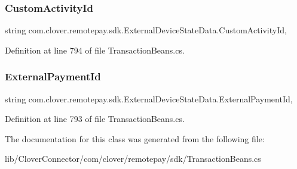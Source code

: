 \subsubsection{\texorpdfstring{Custom\+Activity\+Id}{CustomActivityId}}
{\footnotesize\ttfamily string com.\+clover.\+remotepay.\+sdk.\+External\+Device\+State\+Data.\+Custom\+Activity\+Id\hspace{0.3cm}{\ttfamily [get]}, {\ttfamily [set]}}



Definition at line 794 of file Transaction\+Beans.\+cs.

\mbox{\label{classcom_1_1clover_1_1remotepay_1_1sdk_1_1_external_device_state_data_ae34b82f2e85da36dec8fbe4fae2250be}} 
\subsubsection{\texorpdfstring{External\+Payment\+Id}{ExternalPaymentId}}
{\footnotesize\ttfamily string com.\+clover.\+remotepay.\+sdk.\+External\+Device\+State\+Data.\+External\+Payment\+Id\hspace{0.3cm}{\ttfamily [get]}, {\ttfamily [set]}}



Definition at line 793 of file Transaction\+Beans.\+cs.



The documentation for this class was generated from the following file\+:\begin{DoxyCompactItemize}
\item 
lib/\+Clover\+Connector/com/clover/remotepay/sdk/Transaction\+Beans.\+cs\end{DoxyCompactItemize}
